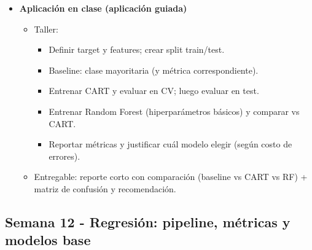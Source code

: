 \documentclass{article}
\begin{document}
\begin{itemize}
\item \textbf{Aplicación en clase (aplicación guiada)}
\begin{itemize}
  \item Taller:
  \begin{itemize}
    \item Definir target y features; crear split train/test.
    \item Baseline: clase mayoritaria (y métrica correspondiente).
    \item Entrenar CART y evaluar en CV; luego evaluar en test.
    \item Entrenar Random Forest (hiperparámetros básicos) y comparar vs CART.
    \item Reportar métricas y justificar cuál modelo elegir (según costo de errores).
  \end{itemize}
  \item Entregable: reporte corto con comparación (baseline vs CART vs RF) + matriz de confusión y recomendación.
\end{itemize}
\end{itemize}

\newpage
\subsection{Semana 12 - Regresión: pipeline, métricas y modelos base}
\vspace{0.2 cm}
\end{document}
